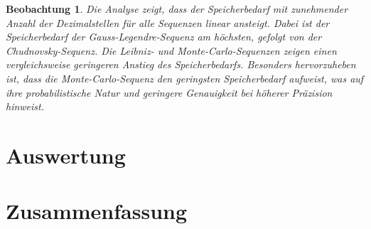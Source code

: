 \documentclass{scrartcl}
\newtheorem{approximation sequence}{Annäherungsfolge}
\newtheorem{observation}{Beobachtung}
\begin{document}
\begin{observation}
    Die Analyse zeigt, dass der Speicherbedarf mit zunehmender Anzahl der
    Dezimalstellen für alle Sequenzen linear ansteigt.
    Dabei ist der Speicherbedarf der Gauss-Legendre-Sequenz am höchsten, gefolgt
    von der Chudnovsky-Sequenz.
    Die Leibniz- und Monte-Carlo-Sequenzen zeigen einen vergleichsweise geringeren
    Anstieg des Speicherbedarfs.
    Besonders hervorzuheben ist, dass die Monte-Carlo-Sequenz den geringsten
    Speicherbedarf aufweist, was auf ihre probabilistische Natur und geringere
    Genauigkeit bei höherer Präzision hinweist.
\end{observation}

\section{Auswertung}

\section{Zusammenfassung}

\printbibliography
\end{document}

